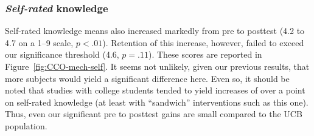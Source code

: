\subsubsection{\emph{Self-rated} knowledge}

Self-rated knowledge means also increased markedly from pre to posttest (4.2
to 4.7 on a 1--9 scale, $p<.01$). Retention of this increase, however,
failed to exceed our significance threshold (4.6, $p=.11$). These scores are
reported in Figure~\ref{fig:CCO-mech-self}. It seems not unlikely, given our
previous results, that more subjects would yield a significant difference here.
Even so, it should be noted that studies with college students tended to yield
increases of over a point on self-rated knowledge (at least with “sandwich”
interventions such as this one). Thus, even our significant pre to posttest
gains are small compared to the UCB population.

